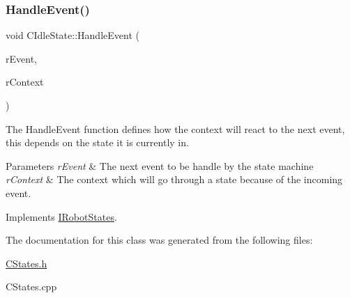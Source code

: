 \subsubsection{\texorpdfstring{Handle\+Event()}{HandleEvent()}}
{\footnotesize\ttfamily void C\+Idle\+State\+::\+Handle\+Event (\begin{DoxyParamCaption}\item[{\hyperlink{classCEvent}{C\+Event} \&}]{r\+Event,  }\item[{\hyperlink{classCRobotContext}{C\+Robot\+Context} \&}]{r\+Context }\end{DoxyParamCaption})\hspace{0.3cm}{\ttfamily [virtual]}}



The Handle\+Event function defines how the context will react to the next event, this depends on the state it is currently in. 


\begin{DoxyParams}{Parameters}
{\em r\+Event} & The next event to be handle by the state machine \\
\hline
{\em r\+Context} & The context which will go through a state because of the incoming event. \\
\hline
\end{DoxyParams}


Implements \hyperlink{classIRobotStates_a0b6c28a3deed04f93371a9395022f1ed}{I\+Robot\+States}.



The documentation for this class was generated from the following files\+:\begin{DoxyCompactItemize}
\item 
\hyperlink{CStates_8h}{C\+States.\+h}\item 
C\+States.\+cpp\end{DoxyCompactItemize}
